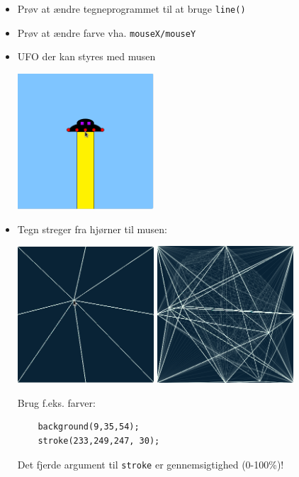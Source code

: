\documentclass[oneside,a4paper,10pts,article]{memoir}
\begin{document}
\begin{itemize}
\item Prøv at ændre tegneprogrammet til at bruge \texttt{line()}
\item Prøv at ændre farve vha. \texttt{mouseX/mouseY}
\item UFO der kan styres med musen

\hspace{1cm}\includegraphics[width=0.4\textwidth]{pics/ufo.png}

\item 
Tegn streger fra hjørner til musen:

\hspace{1cm}\includegraphics[width=0.4\textwidth]{pics/kryds.png}
\hspace{1cm}\includegraphics[width=0.4\textwidth]{pics/kryds-tegning.png}

Brug f.eks. farver:
\begin{lstlisting}
    background(9,35,54);
    stroke(233,249,247, 30);
\end{lstlisting}
Det fjerde argument til \texttt{stroke} er gennemsigtighed (0-100\%)!

\end{itemize}
\end{document}

